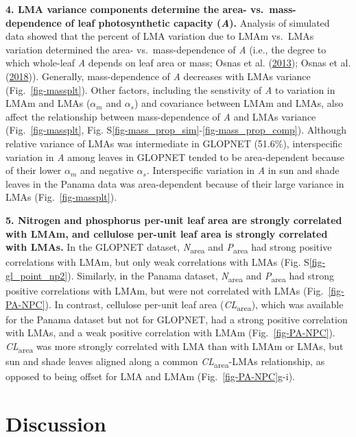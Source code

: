 \documentclass[
  12pt,
  a4paper,
,tablecaptionabove
]{scrartcl}
\begin{document}
\textbf{4. LMA variance components determine the area-
vs.~mass-dependence of leaf photosynthetic capacity (\emph{A}).}
Analysis of simulated data showed that the percent of LMA variation due
to LMAm vs.~LMAs variation determined the area- vs.~mass-dependence of
\emph{A} (i.e., the degree to which whole-leaf \emph{A} depends on leaf
area or mass; Osnas et al. (\protect\hyperlink{ref-Osnas2013}{2013});
Osnas et al. (\protect\hyperlink{ref-Osnas2018}{2018})). Generally,
mass-dependence of \emph{A} decreases with LMAs variance
(Fig.~\ref{fig-massplt}). Other factors, including the senstivity of
\emph{A} to variation in LMAm and LMAs (\(\alpha_m\) and \(\alpha_s\))
and covariance between LMAm and LMAs, also affect the relationship
between mass-dependence of \emph{A} and LMAs variance
(Fig.~\ref{fig-massplt}, Fig.
S\ref{fig-mass_prop_sim}-\ref{fig-mass_prop_comp}). Although relative
variance of LMAs was intermediate in GLOPNET (51.6\%), interspecific
variation in \emph{A} among leaves in GLOPNET tended to be
area-dependent because of their lower \(\alpha_m\) and negative
\(\alpha_s\). Interspecific variation in \emph{A} in sun and shade
leaves in the Panama data was area-dependent because of their large
variance in LMAs (Fig.~\ref{fig-massplt}).

\textbf{5. Nitrogen and phosphorus per-unit leaf area are strongly
correlated with LMAm, and cellulose per-unit leaf area is strongly
correlated with LMAs.} In the GLOPNET dataset,
\emph{N}\textsubscript{area} and \emph{P}\textsubscript{area} had strong
positive correlations with LMAm, but only weak correlations with LMAs
(Fig. S\ref{fig-gl_point_np2}). Similarly, in the Panama dataset,
\emph{N}\textsubscript{area} and \emph{P}\textsubscript{area} had strong
positive correlations with LMAm, but were not correlated with LMAs
(Fig.~\ref{fig-PA-NPC}). In contrast, cellulose per-unit leaf area
(\emph{CL}\textsubscript{area}), which was available for the Panama
dataset but not for GLOPNET, had a strong positive correlation with
LMAs, and a weak positive correlation with LMAm (Fig.~\ref{fig-PA-NPC}).
\emph{CL}\textsubscript{area} was more strongly correlated with LMA than
with LMAm or LMAs, but sun and shade leaves aligned along a common
\emph{CL}\textsubscript{area}-LMAs relationship, as opposed to being
offset for LMA and LMAm (Fig.~\ref{fig-PA-NPC}g-i).

\hypertarget{discussion}{%
\section{Discussion}\label{discussion}}
\end{document}
